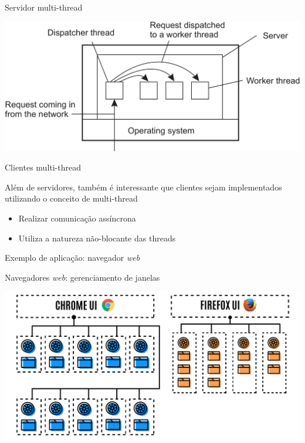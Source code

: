 \documentclass[compress]{beamer}
\begin{document}

\begin{frame}{Servidor multi-thread}

\vspace{1cm}

\centering \includegraphics[width=\textwidth]{images/servidor_threads.png}
\end{frame}


\begin{frame}{Clientes multi-thread}

Além de servidores, também é interessante que clientes sejam implementados utilizando o conceito de multi-thread
\begin{itemize}
    \item Realizar comunicação assíncrona
    \item Utiliza a natureza não-blocante das threads
\end{itemize}

\vspace{0.5cm}

Exemplo de aplicação: navegador \textit{web}

\end{frame}


\begin{frame}{Navegadores \textit{web}: gerenciamento de janelas}

\centering \includegraphics[width=\textwidth]{images/browser_example1.png}

\end{frame}
\end{document}
